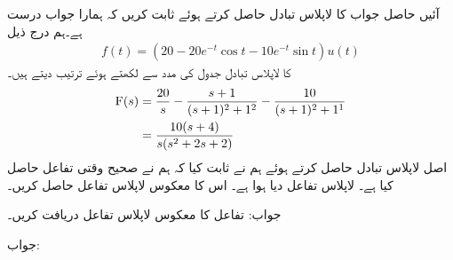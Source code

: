 آئیں حاصل جواب کا لاپلاس تبادل حاصل کرتے ہوئے ثابت کریں کہ ہمارا جواب درست ہے۔ہم درج ذیل
\begin{align*}
f(t)=\left(20-20e^{-t}\cos t-10e^{-t}\sin t\right)u(t)
\end{align*}
 کا لاپلاس تبادل  جدول  کی مدد سے لکھتے ہوئے ترتیب دیتے ہیں۔
\begin{align*}
{\ensuremath{{\textup{F}}}}(s)&=\frac{20}{s}-\frac{s+1}{(s+1)^2+1^2}-\frac{10}{(s+1)^2+1^1}\\
&=\frac{10(s+4)}{s(s^2+2s+2)}
\end{align*}
اصل لاپلاس تبادل حاصل کرتے ہوئے ہم نے ثابت کیا کہ ہم نے صحیح وقتی تفاعل حاصل کیا ہے۔ 
لاپلاس تفاعل  دیا ہوا ہے۔ اس کا معکوس لاپلاس تفاعل  حاصل کریں۔

جواب:
تفاعل  کا معکوس لاپلاس تفاعل دریافت کریں۔

جواب:

